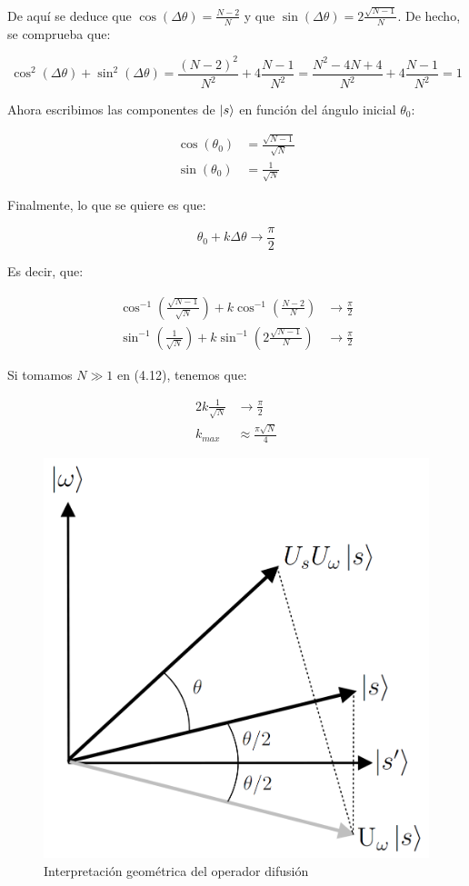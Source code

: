 De aquí se deduce que $\cos(\Delta\theta) = \frac{N-2}{N}$ y que $\sin(\Delta\theta) = 2\frac{\sqrt{N-1}}{N}$. De hecho, se comprueba que:

\begin{equation*}
    \cos^2(\Delta\theta)+\sin^2(\Delta\theta)
    = \frac{(N-2)^2}{N^2} + 4\frac{N-1}{N^2}
    = \frac{N^2-4N+4}{N^2} + 4\frac{N-1}{N^2}
    = 1
\end{equation*}

Ahora escribimos las componentes de $\ket{s}$ en función del ángulo inicial $\theta_0$:

\begin{align}
    \cos(\theta_0) &= \frac{\sqrt{N-1}}{\sqrt{N}} \\
    \sin(\theta_0) &= \frac{1}{\sqrt{N}}
\end{align}

Finalmente, lo que se quiere es que:

\begin{equation}
    \theta_0 + k \Delta\theta \to \frac{\pi}{2}
\end{equation}

Es decir, que:

\begin{align}
    \cos^{-1}(\frac{\sqrt{N-1}}{\sqrt{N}}) + k\cos^{-1}(\frac{N-2}{N}) &\to \frac{\pi}{2} \\
    \sin^{-1}(\frac{1}{\sqrt{N}}) + k\sin^{-1}(2\frac{\sqrt{N-1}}{N}) &\to \frac{\pi}{2}
\end{align}

Si tomamos $N \gg 1$ en (4.12), tenemos que:

\begin{align}
    2k \frac{1}{\sqrt{N}} &\to \frac{\pi}{2} \\
    k_{max} &\approx \frac{\pi \sqrt{N}}{4}
\end{align}

\begin{figure}[H]
\centering \includegraphics[width=0.3\linewidth]{img/grover_geometry.png}
\caption{Interpretación geométrica del operador difusión}
\end{figure}


